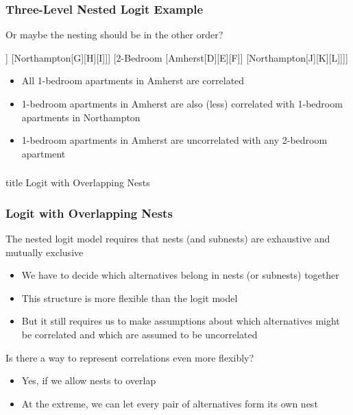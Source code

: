 \documentclass{beamer}
\begin{document}
\begin{frame}\frametitle{Three-Level Nested Logit Example}
    Or maybe the nesting should be in the other order? \\
    \vspace{1ex}
    \centering
    \begin{forest}
    	[Renter [1-Bedroom [Amherst[A][B][C]] [Northampton[G][H][I]]] [2-Bedroom [Amherst[D][E][F]] [Northampton[J][K][L]]]]
    \end{forest}
    \begin{itemize}
    	\item All 1-bedroom apartments in Amherst are correlated
    	\item 1-bedroom apartments in Amherst are also (less) correlated with 1-bedroom apartments in Northampton
    	\item 1-bedroom apartments in Amherst are uncorrelated with any 2-bedroom apartment
    \end{itemize}
\end{frame}

\begin{frame}\frametitle{}
    \vfill
    \centering
    \begin{beamercolorbox}[center]{title}
        \Large Logit with Overlapping Nests
    \end{beamercolorbox}
    \vfill
\end{frame}

\begin{frame}\frametitle{Logit with Overlapping Nests}
    The nested logit model requires that nests (and subnests) are exhaustive and mutually exclusive
    \begin{itemize}
    	\item We have to decide which alternatives belong in nests (or subnests) together
    	\item This structure is more flexible than the logit model
    	\item But it still requires us to make assumptions about which alternatives might be correlated and which are assumed to be uncorrelated
    \end{itemize}
    \vspace{3ex}
    Is there a way to represent correlations even more flexibly?
    \begin{itemize}
    	\item Yes, if we allow nests to overlap
    	\item At the extreme, we can let every pair of alternatives form its own nest
    \end{itemize}
\end{frame}
\end{document}
